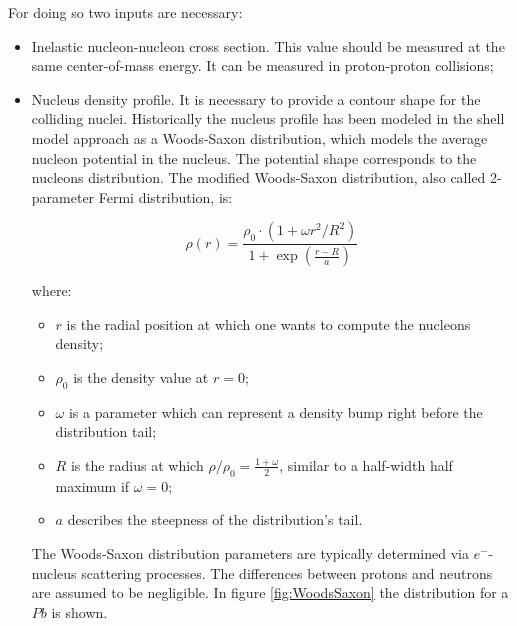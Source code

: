 For doing so two inputs are necessary:
\begin{itemize}
\item Inelastic nucleon-nucleon cross section. 
This value should be measured at the same center-of-mass energy. 
It can be measured in proton-proton collisions;
\item Nucleus density profile. It is necessary to provide a contour shape for the colliding nuclei. 
Historically the nucleus profile has been modeled in the shell model approach as a Woods-Saxon distribution, which models the average nucleon potential in the nucleus. 
The potential shape corresponds to the nucleons distribution.
The modified Woods-Saxon distribution, also called 2-parameter Fermi distribution, is:

\begin{equation}
\label{eq:WoodsSaxon}
\rho(r) = \frac{\rho_0\cdot(1+\omega r^2/R^2)}{1+\exp(\frac{r-R}{a})}
\end{equation}

where:
\begin{itemize}
\item $r$ is the radial position at which one wants to compute the nucleons density;
\item $\rho_0$ is the density value at $r=0$;
\item $\omega$ is a parameter which can represent a density bump right before the distribution tail;
\item $R$ is the radius at which $\rho/\rho_0=\frac{1+\omega}{2}$, similar to a half-width half maximum if $\omega=0$;
\item $a$ describes the steepness of the distribution's tail.
\end{itemize}
The Woods-Saxon distribution parameters are typically determined via $e^-$-nucleus scattering processes.
The differences between protons and neutrons are assumed to be negligible.
In figure \ref{fig:WoodsSaxon} the distribution for a $Pb$ is shown.

\end{itemize}


